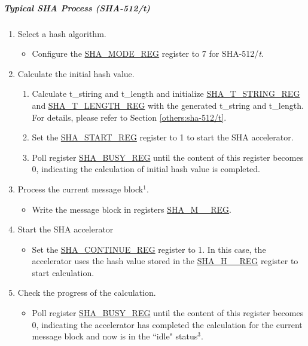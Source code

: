 \documentclass[main\_\_EN.tex]{subfiles}
\begin{document}
\subparagraph{Typical SHA Process (SHA-512/{\it{t}})}

\begin{enumerate}
    \item \label{others:sha-sel-algorithm2} Select a hash algorithm.
    \begin{itemize}
        \item Configure the \hyperref[regdesc:SHAMODEREG]{SHA\_MODE\_REG} register to 7 for SHA-512/{\it{t}}.
    \end{itemize}
    \item Calculate the initial hash value.
        \begin{enumerate}
            \item Calculate t\_stiring and t\_length and initialize \hyperref[regdesc:SHATSTRINGREG]{SHA\_T\_STRING\_REG} and  \hyperref[regdesc:SHATLENGTHREG]{SHA\_T\_LENGTH\_REG} with the generated t\_string and t\_length. For details, please refer to Section \ref{others:sha-512/t}.
            \item Set the \hyperref[regdesc:SHASTARTREG]{SHA\_START\_REG} register to 1 to start the SHA accelerator.
            \item Poll register \hyperref[regdesc:SHABUSYREG]{SHA\_BUSY\_REG} until the content of this register becomes 0, indicating the calculation of initial hash value is completed.
        \end{enumerate}

    \item \label{others:sha-current-block1} Process the current message block\hyperref[others:sha-note-typical-sha]{$^1$}.
    \begin{itemize}
        \item Write the message block in registers \hyperref[regdesc:SHAMNREG]{SHA\_M\_\_REG}.
    \end{itemize}
    \item Start the SHA accelerator
    \begin{itemize}
        \item Set the \hyperref[regdesc:SHACONTINUEREG]{SHA\_CONTINUE\_REG} register to 1. In this case, the accelerator uses the hash value stored in the \hyperref[regdesc:SHAHNREG]{SHA\_H\_\_REG} register to start calculation.
    \end{itemize}

    \item Check the progress of the calculation.
    \begin{itemize}
        \item Poll register \hyperref[regdesc:SHABUSYREG]{SHA\_BUSY\_REG} until the content of this register becomes 0, indicating the accelerator has completed the calculation for the current message block and now is in the ``idle" status\hyperref[others:sha-note-typical-sha]{$^3$}.
    \end{itemize}


\end{enumerate}
\end{document}
